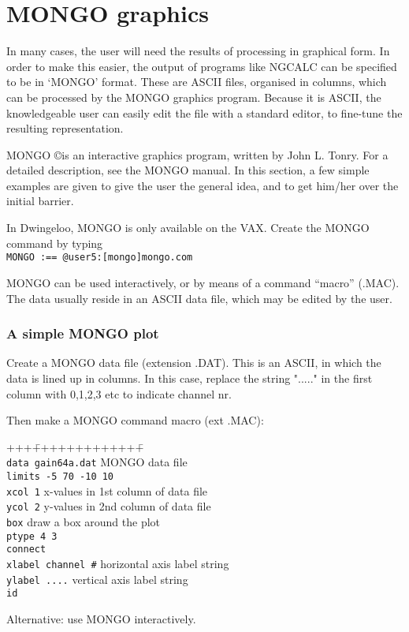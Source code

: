 %
%
%
\chapter{ MONGO graphics}

In many cases, the user will need the results of \NEWSTAR processing in
graphical form. In order to make this easier, the output of programs
like NGCALC can be specified to be in `MONGO' format. These are
ASCII files, organised in columns, which can be processed by the
MONGO graphics program. Because it is ASCII, the knowledgeable user
can easily edit the file with a standard editor, to fine-tune the 
resulting representation.

MONGO \copyright is an interactive graphics program, written by John L. Tonry.
For a detailed description, see the MONGO manual. %
In this section, a few simple examples are given to give the user the
general idea, and to get him/her over the initial barrier.

In Dwingeloo, MONGO is only available on the VAX.
Create the MONGO command by typing
\\ \verb&MONGO :== @user5:[mongo]mongo.com& 

MONGO can be used interactively, or by means of a command ``macro'' (.MAC).
The data usually reside in an ASCII data file, which may be edited by
the user. 

\subsection{A simple MONGO plot}
\label{.simple.plot}

Create a MONGO data file (extension .DAT).
This is an ASCII, in which the data is lined up in columns.
In this case, replace the string "....." in the first column with 0,1,2,3 etc
to indicate channel nr. 

Then make a MONGO command macro (ext .MAC):
\begin{tabbing}
+++\=+++++++++++++\=   \kill			%
\\ \> \verb&data gain64a.dat& 	\>MONGO data file
\\ \> \verb&limits -5 70 -10 10&\>
\\ \> \verb&xcol 1&		\>x-values in 1st column of data file
\\ \> \verb&ycol 2&		\>y-values in 2nd column of data file
\\ \> \verb&box&		\>draw a box around the plot
\\ \> \verb&ptype 4 3&		\>
\\ \> \verb&connect&		\>
\\ \> \verb&xlabel channel #&	\>horizontal axis label string
\\ \> \verb&ylabel ....&	\>vertical axis label string
\\ \> \verb&id&			\>
\end{tabbing}

Alternative: use MONGO interactively.
